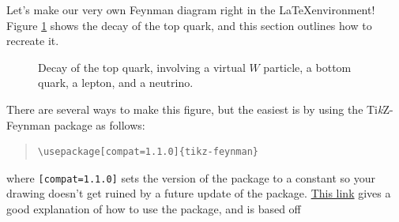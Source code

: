 \documentclass[12pt, letterpaper]{article}
\begin{document}
Let's make our very own Feynman diagram right in the \LaTeX environment! Figure \ref{fig:feynman} shows the decay of the top quark, and this section outlines how to recreate it.

\begin{figure}[ht!]
  \centering
  \caption{Decay of the top quark, involving a virtual $W$ particle, a bottom quark, a lepton, and a neutrino.}
  \label{fig:feynman}
\end{figure}

There are several ways to make this figure, but the easiest is by using the Ti\textit{k}Z-Feynman package as follows:

\begin{quote}
\begin{verbatim}
\usepackage[compat=1.1.0]{tikz-feynman}
\end{verbatim}
\end{quote}

where {\tt [compat=1.1.0]} sets the version of the package to a constant so your drawing doesn't get ruined by a future update of the package. \href{https://www.overleaf.com/learn/latex/feynman\_diagrams}{This link} gives a good explanation of how to use the package, and is based off \citet[]{Ellis2016}
\end{document}
